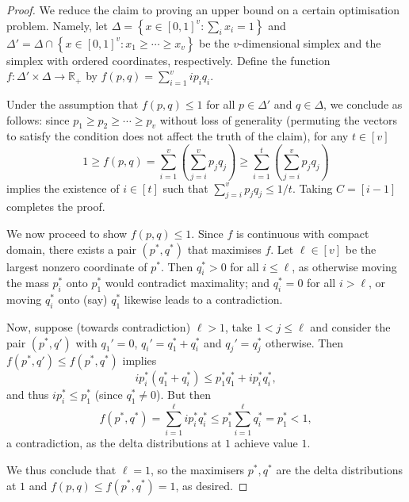 \documentclass[a4paper,UKenglish,cleveref, autoref, thm-restate]{lipics-v2021}
\theoremstyle{definition}
\newcommand{\R}{\mathbb R}
\renewcommand{\set}[1]{\left\{#1\right\}}
\newcommand{\vcommitlength}{v}
\begin{document}
\begin{proof}
    We reduce the claim to proving an upper bound on a certain optimisation problem. Namely, let $\Delta = \set{x \in [0,1]^\vcommitlength : \sum_i x_i = 1}$ and $\Delta' = \Delta \cap \set{x \in [0,1]^\vcommitlength : x_1 \geq \cdots \geq x_\vcommitlength}$ be the $\vcommitlength$-dimensional simplex and the simplex with ordered coordinates, respectively. Define the function $f: \Delta' \times \Delta \to \R_+$ by $f(p,q) = \sum_{i = 1}^\vcommitlength i p_i q_i$.
    
    Under the assumption that $f(p,q) \leq 1$ for all $p \in \Delta'$ and $q \in \Delta$, we conclude as follows: since $p_1 \geq p_2 \geq \cdots \geq p_\vcommitlength$ without loss of generality (permuting the vectors to satisfy the condition does not affect the truth of the claim), for any $t \in [\vcommitlength]$
    \begin{equation*}
        1 \geq f(p,q) = \sum_{i = 1}^\vcommitlength \left(\sum_{j = i}^{\vcommitlength} p_j q_j \right) \geq \sum_{i = 1}^t \left( \sum_{j = i}^\vcommitlength p_j q_j \right)
    \end{equation*}
    implies the existence of $i \in [t]$ such that $\sum_{j = i}^\vcommitlength p_j q_j \leq 1/t$. Taking $C = [i - 1]$ completes the proof.

    We now proceed to show $f(p,q) \leq 1$. Since $f$ is continuous with compact domain, there exists a pair $(p^*, q^*)$ that maximises $f$. Let $\ell \in [\vcommitlength]$ be the largest nonzero coordinate of $p^*$. Then $q_i^* > 0$ for all $i \leq \ell$, as otherwise moving the mass $p_i^*$ onto $p_1^*$ would contradict maximality;  and $q_i^* = 0$ for all $i > \ell$, or moving $q_i^*$ onto (say) $q_1^*$ likewise leads to a contradiction.

    Now, suppose (towards contradiction) $\ell > 1$, take $1 < j \leq \ell$ and consider the pair $(p^*, q')$ with $q_1' = 0$, $q_i' = q_1^* + q_i^*$ and $q_j' = q_j^*$ otherwise. Then $f(p^*, q') \leq f(p^*, q^*)$ implies
    \begin{equation*}
      i p_i^* (q_1^* + q_i^*) \leq p_1^* q_1^* + i p_i^* q_i^*,
    \end{equation*}
    and thus $i p_i^* \leq p_1^*$ (since $q_1^* \neq 0$). But then
    \begin{equation*}
        f(p^*, q^*) = \sum_{i = 1}^\ell i p_i^* q_i^* \leq p_1^* \sum_{i = 1}^\ell q_i^* = p_1^* < 1,
    \end{equation*}
    a contradiction, as the delta distributions at $1$ achieve value $1$.
    
    We thus conclude that $\ell = 1$, so the maximisers $p^*, q^*$ are the delta distributions at $1$ and $f(p,q) \leq  f(p^*,q^*) = 1$, as desired.
\end{proof}
\end{document}
